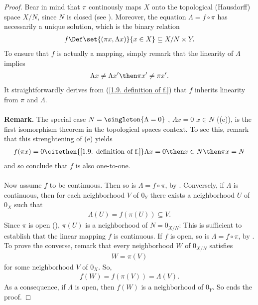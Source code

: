 \begin{proof} Bear in mind that 
%
  $\pi$ continously maps $X$ onto the topological (Hausdorff) space $X/N$, 
  since $N$ is closed (see ).
%
Moreover, the equation 
% 
  $\Lambda = f \circ \pi$ 
% 
has necessarily a unique solution, which is the binary relation 
%
  \begin{align}\label{1.9. definition of f.}
     f \Def\set{(\pi x, \Lambda x)}{x \in X} \subseteq X/N \times Y.
    \end{align}
%
To ensure that $f$ is actually a mapping, simply remark that 
the linearity of $\Lambda$ implies 
%
  \begin{align}
    \Lambda x \neq \Lambda  x' \then \pi x' \neq \pi x'.
  \end{align}
%
It straightforwardly derives from (\ref{1.9. definition of f.}) that 
$f$ inherits linearity from $\pi$ and $\Lambda$.\\
\\ 
{\bf Remark.} The special case 
%
  $N = \singleton{\Lambda = 0}$ , \ie $\Lambda x= 0$ \iif $x\in N$ (\cf (e)), %
%
is the first isomorphism theorem in the topological spaces context. 
To see this, remark that this strenghtening of (e) yields 
%
  \begin{align}
    f(\pi x) = 0
      \citethen{\ref{1.9. definition of f.}}
    \Lambda x = 0
      \then 
    x \in N 
      \then 
    \pi x = N
\end{align}
and so conclude that $f$ is also one-to-one.
%
%
%
\\\\
Now assume $f$ to be continuous. Then so is 
%
  $\Lambda = f\circ \pi $, 
% 
by . 
%
Conversely, 
%
if $\Lambda$ is continuous, then for each neighborhood $V$ of $0_Y$ 
there exists a neighborhood $U$ of $0_X$ such that
%
  \begin{align}
    \Lambda(U) = f\left(\pi(U)\right) 
      \subseteq 
    V.
  \end{align}
%
Since $\pi$ is open (), $\pi(U)$ is a neighborhood of 
%
  $N=0_{X/N}$: 
This is sufficient to establish that the linear mapping $f$ is continuous.
%
If $f$ is open, so is $\Lambda = f\circ \pi$, by . 
%
To prove the converse, remark that 
%
  every neighborhood $W$ of $0_{X/N}$ satisfies %
%
  \begin{align}
    W = \pi(V)
  \end{align}
%
for some neighborhood $V$ of $0_X$. So, 
%
  \begin{align}
    f(W) = f \left(\pi(V)\right) = \Lambda(V).
  \end{align}
%
As a consequence, 
% 
  if $\Lambda$ is open, then $f(W)$ is a neighborhood of $0_Y$. %
%
So ends the proof.
\end{proof}


